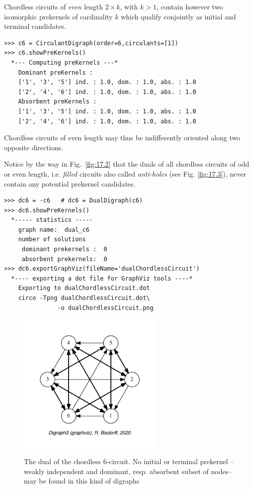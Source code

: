 Chordless circuits of \emph{even} length $2 \times k$, with $k > 1$, contain however two isomorphic prekernels of cardinality $k$ which qualify conjointly as initial and terminal candidates.
\begin{lstlisting}[caption={The prekernels of the 6-circuit digraph},label=list:17.6]
>>> c6 = CirculantDigraph(order=6,circulants=[1])
>>> c6.showPreKernels()
  *--- Computing preKernels ---*
    Dominant preKernels :
    ['1', '3', '5'] ind. : 1.0, dom. : 1.0, abs. : 1.0
    ['2', '4', '6'] ind. : 1.0, dom. : 1.0, abs. : 1.0
    Absorbent preKernels :
    ['1', '3', '5'] ind. : 1.0, dom. : 1.0, abs. : 1.0
    ['2', '4', '6'] ind. : 1.0, dom. : 1.0, abs. : 1.0
\end{lstlisting}
Chordless circuits of even length may thus be indifferently oriented along two opposite directions.

Notice by the way in Fig.~\vref{fig:17.2} that the duals of all chordless circuits of odd or even length, i.e. \emph{filled} circuits also called \emph{anti-holes} (see Fig. \ref{fig:17.3}), never contain any potential prekernel candidates.
\begin{lstlisting}[caption={The prekernels of the dual of the 6-circuit digraph},label=list:17.7]
>>> dc6 = -c6   # dc6 = DualDigraph(c6)
>>> dc6.showPreKernels()
  *----- statistics -----
    graph name:  dual_c6
    number of solutions
     dominant prekernels :  0
     absorbent prekernels:  0
>>> dc6.exportGraphViz(fileName='dualChordlessCircuit')
  *---- exporting a dot file for GraphViz tools ----*
    Exporting to dualChordlessCircuit.dot
    circo -Tpng dualChordlessCircuit.dot\
               -o dualChordlessCircuit.png
\end{lstlisting}
\begin{figure}[h]
\sidecaption[t]
\includegraphics[width=7cm]{Figures/17-2-dualChordlessCircuit.pdf}
\caption{The dual of the chordless 6-circuit. No initial or terminal prekernel --weakly independent and dominant, resp. absorbent subset of nodes-- may be found in this kind of digraphs}
\label{fig:17.2}       %
\end{figure}

